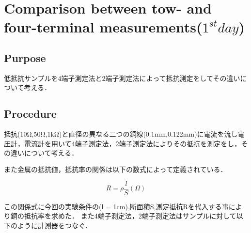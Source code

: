 \documentclass[11pt, a4paper,twocolumn]{jarticle}
\begin{document}
\section{Comparison between tow- and four-terminal measurements($1^{st} day$)}

\subsection{Purpose}
低抵抗サンプルを4端子測定法と2端子測定法によって抵抗測定をしてその違いについて考える．
\subsection{Procedure}
抵抗(10Ω,50Ω,1kΩ)と直径の異なる二つの銅線(0.1mm,0.122mm)に電流を流し電圧計，電流計を用いて4端子測定法，2端子測定法によりその抵抗を測定をし，その違いについて考える．

また金属の抵抗値，抵抗率の関係は以下の数式によって定義されている．

\begin{equation}
    R = \rho\frac{l}{S}(\Omega)
\end{equation}

この関係式に今回の実験条件の(l = 1cm),断面積S,測定抵抗Rを代入する事により銅の抵抗率を求めた．
また4端子測定法，2端子測定法はサンプルに対して以下のように計測器をつなぐ．
\end{document}
